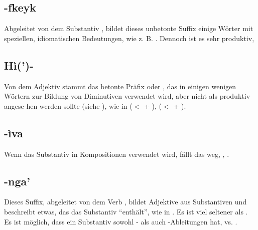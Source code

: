 \subsection{-fkeyk} Abgeleitet von dem Substantiv  , bildet dieses unbetonte Suffix einige Wörter mit speziellen, idiomatischen Bedeutungen, wie z. B.  . Dennoch ist es sehr produktiv,  

\subsection{Hì(')-} Von dem Adjektiv   stammt das betonte Präfix  oder , das in einigen wenigen Wörtern zur Bildung von Diminutiven verwendet wird, aber nicht als produktiv angese-hen werden sollte (siehe ), wie in   ($<$  +  ),   ($<$  +  ).

\subsection{-ìva} Wenn das Substantiv   in Kompositionen verwendet wird, fällt das  weg,  ,  .

\subsection{-nga'} Dieses Suffix, abgeleitet von dem Verb  , bildet Adjektive aus Substantiven und beschreibt etwas, das das Substantiv ``enthält'', wie in  . Es ist viel seltener als . Es ist möglich, dass ein Substantiv sowohl - als auch -Ableitungen hat,   vs.  .

